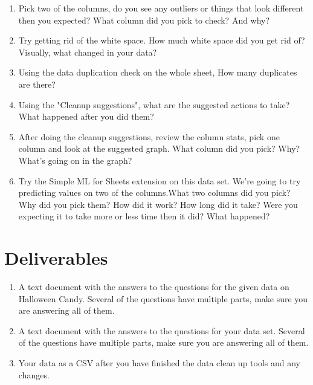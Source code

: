 \documentclass[12pt]{article}
\begin{document}
    \begin{enumerate}
        \item Pick two of the columns, do you see any outliers or things that look different then you expected? What column did you pick to check? And why?
        \item Try getting rid of the white space.  How much white space did you get rid of? Visually, what changed in your data?
        \item Using the data duplication check on the whole sheet, How many duplicates are there?
        \item Using the "Cleanup suggestions", what are the suggested actions to take? What happened after you did them? 
        \item After doing the cleanup suggestions, review the column stats, pick one column and look at the suggested graph.  What column did you pick? Why? What's going on in the graph? 
        \item Try the Simple ML for Sheets extension on this data set. We're going to try predicting values on two of the columns.What two columns did you pick? Why did you pick them? How did it work? How long did it take? Were you expecting it to take more or less time then it did? What happened?
    \end{enumerate}


\section*{Deliverables}
\begin{enumerate}
    \item A text document with the answers to the questions for the given data on Halloween Candy.  Several of the questions have multiple parts, make sure you are answering all of them.
    \item A text document with the answers to the questions for your data set.  Several of the questions have multiple parts, make sure you are answering all of them.
    \item Your data as a CSV after you have finished the data clean up tools and any changes. 
\end{enumerate}
\end{document}
